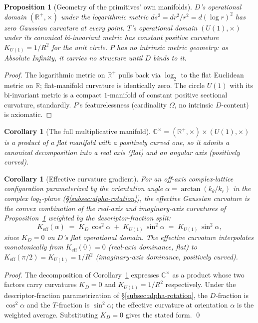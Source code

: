 \documentclass[11pt,a4paper]{article}
\newtheorem{corollary}[theorem]{Corollary}
\newtheorem{proposition}[theorem]{Proposition}
\theoremstyle{definition}
\theoremstyle{remark}
\newcommand{\R}{\mathbb{R}}
\newcommand{\C}{\mathbb{C}}
\begin{document}
\begin{proposition}[Geometry of the primitives' own manifolds]\label{prop:primitive-geometries}
$D$'s operational domain $(\R^{+},\times)$ under the logarithmic metric $ds^{2} = dr^{2}/r^{2} = d(\log r)^{2}$ has zero Gaussian curvature at every point. $T$'s operational domain $(U(1),\times)$ under its canonical bi-invariant metric has constant positive curvature $K_{U(1)} = 1/R^{2}$ for the unit circle. $P$ has no intrinsic metric geometry: as Absolute Infinity, it carries no structure until $D$ binds to it.
\end{proposition}

\begin{proof}
The logarithmic metric on $\R^{+}$ pulls back via $\log_{2}$ to the flat Euclidean metric on $\R$; flat-manifold curvature is identically zero. The circle $U(1)$ with its bi-invariant metric is a compact $1$-manifold of constant positive sectional curvature, standardly. $P$'s featurelessness (cardinality $\Omega$, no intrinsic $D$-content) is axiomatic.
\end{proof}

\begin{corollary}[The full multiplicative manifold]\label{cor:CMinus0}
$\C^{\times} = (\R^{+},\times)\times(U(1),\times)$ is a product of a flat manifold with a positively curved one, so it admits a canonical decomposition into a real axis (flat) and an angular axis (positively curved).
\end{corollary}

\begin{corollary}[Effective curvature gradient]\label{cor:K-eff}
For an off-axis complex-lattice configuration parameterized by the orientation angle $\alpha = \arctan(k_{\theta}/k_{r})$ in the complex log$_{2}$-plane (\S\ref{subsec:alpha-rotation}), the effective Gaussian curvature is the convex combination of the real-axis and imaginary-axis curvatures of Proposition~\ref{prop:primitive-geometries} weighted by the descriptor-fraction split:
\[
K_{\mathrm{eff}}(\alpha) \;=\; K_{D}\,\cos^{2}\alpha \;+\; K_{U(1)}\,\sin^{2}\alpha \;=\; K_{U(1)}\,\sin^{2}\alpha,
\]
since $K_{D} = 0$ on $D$'s flat operational domain. The effective curvature interpolates monotonically from $K_{\mathrm{eff}}(0) = 0$ (real-axis dominance, flat) to $K_{\mathrm{eff}}(\pi/2) = K_{U(1)} = 1/R^{2}$ (imaginary-axis dominance, positively curved).
\end{corollary}

\begin{proof}
The decomposition of Corollary~\ref{cor:CMinus0} expresses $\C^{\times}$ as a product whose two factors carry curvatures $K_{D} = 0$ and $K_{U(1)} = 1/R^{2}$ respectively. Under the descriptor-fraction parametrization of \S\ref{subsec:alpha-rotation}, the $D$-fraction is $\cos^{2}\alpha$ and the $T$-fraction is $\sin^{2}\alpha$; the effective curvature at orientation $\alpha$ is the weighted average. Substituting $K_{D} = 0$ gives the stated form. \qed
\end{proof}
\end{document}
